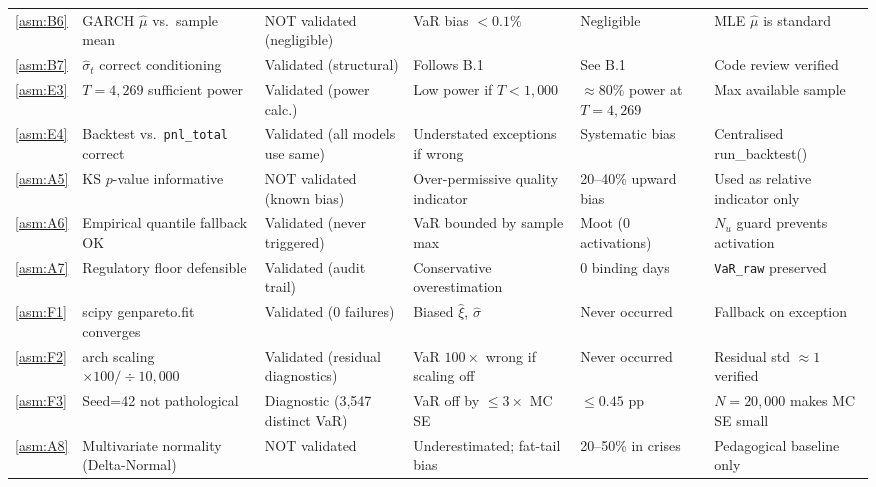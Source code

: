 \documentclass[11pt,a4paper]{article}
\newcommand{\code}[1]{\texttt{#1}}
\begin{document}
\begin{footnotesize}
\begin{longtable}{@{}p{0.65cm} p{4.0cm} p{2.6cm} p{3.4cm} p{2.0cm} p{2.8cm}@{}}
\cref{asm:B6}  & GARCH $\hat{\mu}$ vs.\ sample mean & NOT validated (negligible) & VaR bias $<0.1\%$ & Negligible & MLE $\hat{\mu}$ is standard \\[4pt]

\cref{asm:B7}  & $\hat{\sigma}_t$ correct conditioning & Validated (structural) & Follows B.1 & See B.1 & Code review verified \\[4pt]

\cref{asm:E3}  & $T=4{,}269$ sufficient power & Validated (power calc.) & Low power if $T<1{,}000$ & $\approx 80\%$ power at $T=4{,}269$ & Max available sample \\[4pt]

\cref{asm:E4}  & Backtest vs.\ \code{pnl\_total} correct & Validated (all models use same) & Understated exceptions if wrong & Systematic bias & Centralised run\_backtest() \\[4pt]

\cref{asm:A5}  & KS $p$-value informative & NOT validated (known bias) & Over-permissive quality indicator & 20--40\% upward bias & Used as relative indicator only \\[4pt]

\cref{asm:A6}  & Empirical quantile fallback OK & Validated (never triggered) & VaR bounded by sample max & Moot (0 activations) & $N_u$ guard prevents activation \\[4pt]

\cref{asm:A7}  & Regulatory floor defensible & Validated (audit trail) & Conservative overestimation & 0 binding days & \code{VaR\_raw} preserved \\[4pt]

\cref{asm:F1}  & scipy genpareto.fit converges & Validated (0 failures) & Biased $\hat{\xi}$, $\hat{\sigma}$ & Never occurred & Fallback on exception \\[4pt]

\cref{asm:F2}  & arch scaling $\times100/\div10{,}000$ & Validated (residual diagnostics) & VaR $100\times$ wrong if scaling off & Never occurred & Residual std $\approx 1$ verified \\[4pt]

\cref{asm:F3}  & Seed=42 not pathological & Diagnostic (3{,}547 distinct VaR) & VaR off by $\le 3\times$ MC SE & $\le 0.45$ pp & $N=20{,}000$ makes MC SE small \\[4pt]

\cref{asm:A8}  & Multivariate normality (Delta-Normal) & NOT validated & Underestimated; fat-tail bias & 20--50\% in crises & Pedagogical baseline only \\[4pt]


\end{longtable}
\end{footnotesize}
\end{document}
